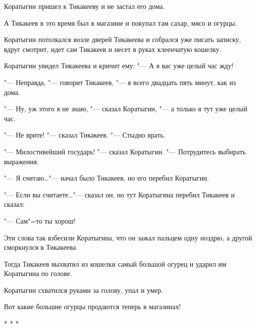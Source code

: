 Коратыгин пришел к Тикакееву и не застал его дома.

А Тикакеев в это время был в магазине и покупал там сахар, мясо и огурцы.

Коратыгин потолкался возле дверей Тикакеева и собрался уже писать записку, вдруг смотрит, идет сам Тикакеев и несет в руках клеенчатую кошелку.

Коратыгин увидел Тикакеева и кричит ему: "--- А я вас уже целый час жду!

"--- Неправда, "--- говорит Тикакеев, "--- я всего двадцать пять минут, как из дома.

"--- Ну, уж этого я не знаю, "--- сказал Коратыгин, "--- а только я тут уже целый час.

"--- Не врите! "--- сказал Тикакеев. "--- Стыдно врать.

"--- Милостивейший государь! "--- сказал Коратыгин. "--- Потрудитесь выбирать выражения.

"--- Я считаю\dots "--- начал было Тикакеев, но его перебил Коратыгин.

"--- Если вы считаете\dots "--- сказал он, но тут Коратыгина перебил Тикакеев и сказал:

"--- Сам"=то ты хорош!

Эти слова так взбесили Коратыгина, что он зажал пальцем одну ноздрю, а другой сморкнулся в Тикакеева.

Тогда Тикакеев выхватил из кошелки самый большой огурец и ударил им Коратыгина по голове.

Коратыгин схватился руками за голову, упал и умер.

Вот какие большие огурцы продаются теперь в магазинах!


\begin{center}
* * *
\end{center}
